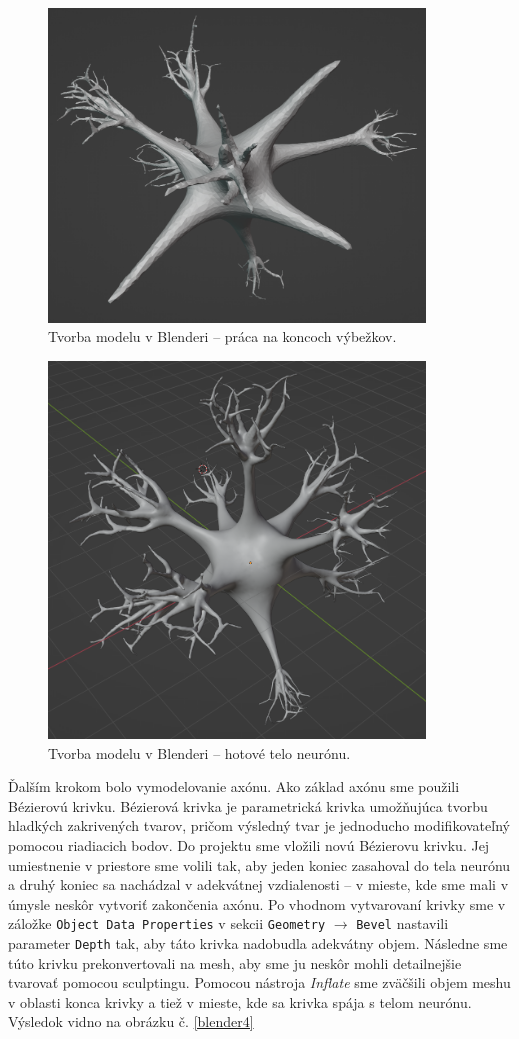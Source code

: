 \begin{figure}[!htbp]
  \centering
  \includegraphics[width=10cm]{img/n2-crop.png}
  \caption{Tvorba modelu v Blenderi {--} práca na koncoch výbežkov.}
  \label{blender2}
\end{figure}	

\begin{figure}[!htbp]
  \centering
  \includegraphics[width=10cm]{img/n3-crop.png}
  \caption{Tvorba modelu v Blenderi {--} hotové telo neurónu.}
  \label{blender3}
\end{figure}	

Ďalším krokom bolo vymodelovanie axónu. Ako základ axónu sme použili Bézierovú krivku. Bézierová krivka je parametrická krivka umožňujúca tvorbu hladkých zakrivených tvarov, pričom výsledný tvar je
jednoducho modifikovateľný pomocou riadiacich bodov. Do projektu sme vložili novú Bézierovu krivku. Jej umiestnenie v priestore sme volili tak, aby jeden koniec zasahoval do tela neurónu 
a druhý koniec sa nachádzal v adekvátnej vzdialenosti {--} v mieste, kde sme mali v úmysle neskôr vytvoriť zakončenia axónu. Po vhodnom vytvarovaní krivky sme v záložke \texttt{Object Data Properties}
v sekcii \texttt{Geometry} $\rightarrow$ \texttt{Bevel} nastavili parameter \texttt{Depth} tak, aby táto krivka nadobudla adekvátny objem. Následne sme túto krivku prekonvertovali na mesh, aby 
sme ju neskôr mohli detailnejšie tvarovať pomocou sculptingu. 
Pomocou nástroja \emph{Inflate} sme zväčšili objem meshu v oblasti konca krivky a tiež v mieste, kde sa krivka spája s telom neurónu. Výsledok vidno na obrázku č. \ref{blender4}

